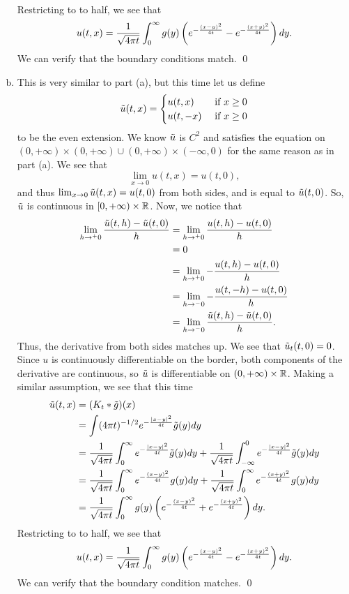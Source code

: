 \documentclass{article}
\begin{document}
\begin{enumerate}[(a)]
\begin{align*}
    \end{align*} 
    Restricting to to half, we see that 
    \[u(t,x) = \frac{1}{\sqrt{4\pi t}}\int_{0}^\infty  g(y)\del{ e^{-\frac{(x-y)^2}{4t}} - e^{-\frac{(x+y)^2}{4t}}}dy.\]
    We can verify that the boundary conditions match. \qed
    \item This is very similar to part (a), but this time let us define 
    \[\tilde{u}(t,x) = \begin{cases}
        u(t,x) &\text{ if } x \ge 0 \\
        u(t,-x) &\text{ if } x \ge 0 \\
    \end{cases}\]
    to be the even extension. 
    \hop 
    We know $\tilde{u}$ is $C^2$ and satisfies the equation on  $(0, +\infty) \times (0, +\infty)  \cup (0, +\infty) \times (-\infty, 0)$ for the same reason as in part (a). 
    \hop 
    We see that 
    \[\lim_{x \to 0} u(t,x) = u(t,0),\]
    and thus $\lim_{x \to 0} \tilde{u}(t,x) = u(t,0)$ from both sides, and is equal to $\tilde{u}(t,0)$. So, $\tilde{u}$ is continuous in $[0,+\infty)\times \mathbb{R}$. 
    \hop 
    Now, we notice that 
    \begin{align*}
        \lim_{h\to^+ 0} \frac{\tilde{u}(t,h)- \tilde{u}(t,0)}{h}
        &= \lim_{h\to^+ 0} \frac{u(t,h) - u(t,0)}{h}\\
        &= 0 \\
        &= \lim_{h\to^+ 0} -\frac{u(t,h) - u(t,0)}{h}\\
        &= \lim_{h\to^- 0} -\frac{u(t,-h) - u(t,0)}{h}\\
        &= \lim_{h\to^- 0} \frac{\tilde{u}(t,h)-\tilde{u}(t,0)}{h}.\\
    \end{align*}
    Thus, the derivative from both sides matches up. We see that $\tilde{u}_t(t,0) = 0$. Since $u$ is continuously differentiable on the border, both components of the derivative are continuous, so $\tilde{u}$ is differentiable on $(0, +\infty) \times \mathbb{R}$. 
    \hop 
    Making a similar assumption, we see that this time 
    \begin{align*}
        \tu(t,x) &= (K_t * \tilde{g})(x)\\
        &= \int(4\pi t)^{-1/2} e^{-\frac{|x-y|^2}{4t}} \tilde{g}(y)dy\\
        &=  \frac{1}{\sqrt{4\pi t}}\int_{0}^\infty  e^{-\frac{|x-y|^2}{4t}} \tilde{g}(y)dy+ \frac{1}{\sqrt{4\pi t}}\int_{-\infty}^0  e^{-\frac{|x-y|^2}{4t}} \tilde{g}(y)dy\\
        &=  \frac{1}{\sqrt{4\pi t}}\int_{0}^\infty  e^{-\frac{(x-y)^2}{4t}} g(y)dy+ \frac{1}{\sqrt{4\pi t}}\int_{0}^\infty  e^{-\frac{(x+y)^2}{4t}} g(y)dy\\
        &=  \frac{1}{\sqrt{4\pi t}}\int_{0}^\infty  g(y)\del{ e^{-\frac{(x-y)^2}{4t}} + e^{-\frac{(x+y)^2}{4t}}}dy.\\
    \end{align*} 
    Restricting to to half, we see that 
    \[u(t,x) = \frac{1}{\sqrt{4\pi t}}\int_{0}^\infty  g(y)\del{ e^{-\frac{(x-y)^2}{4t}} - e^{-\frac{(x+y)^2}{4t}}}dy.\]
    We can verify that the boundary condition matches. \qed
\end{enumerate}
\end{document}
